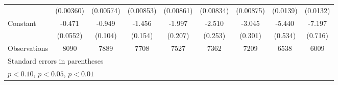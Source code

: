 \begin{table}[htbp]
\begin{tabular}{l*{8}{c}}
                    &   (0.00360)         &   (0.00574)         &   (0.00853)         &   (0.00861)         &   (0.00834)         &   (0.00875)         &    (0.0139)         &    (0.0132)         \\
[1em]
Constant            &      -0.471\sym{***}&      -0.949\sym{***}&      -1.456\sym{***}&      -1.997\sym{***}&      -2.510\sym{***}&      -3.045\sym{***}&      -5.440\sym{***}&      -7.197\sym{***}\\
                    &    (0.0552)         &     (0.104)         &     (0.154)         &     (0.207)         &     (0.253)         &     (0.301)         &     (0.534)         &     (0.716)         \\
\hline
Observations        &        8090         &        7889         &        7708         &        7527         &        7362         &        7209         &        6538         &        6009         \\
\hline\hline
\multicolumn{9}{l}{\footnotesize Standard errors in parentheses}\\
\multicolumn{9}{l}{\footnotesize \sym{*} \(p<0.10\), \sym{**} \(p<0.05\), \sym{***} \(p<0.01\)}\\
\end{tabular}
\end{table}
